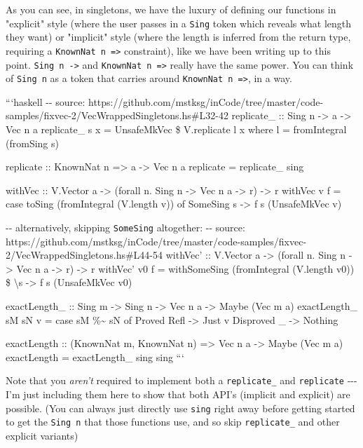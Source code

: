 \documentclass[]{article}
\begin{document}
As you can see, in singletons, we have the luxury of defining our functions in
"explicit" style (where the user passes in a \texttt{Sing} token which reveals
what length they want) or "implicit" style (where the length is inferred from
the return type, requiring a \texttt{KnownNat\ n\ =\textgreater{}} constraint),
like we have been writing up to this point. \texttt{Sing\ n\ -\textgreater{}}
and \texttt{KnownNat\ n\ =\textgreater{}} really have the same power. You can
think of \texttt{Sing\ n} as a token that carries around
\texttt{KnownNat\ n\ =\textgreater{}}, in a way.

```haskell -\/- source:
https://github.com/mstksg/inCode/tree/master/code-samples/fixvec-2/VecWrappedSingletons.hs\#L32-42
replicate\_ :: Sing n -\textgreater{} a -\textgreater{} Vec n a replicate\_ s x
= UnsafeMkVec \$ V.replicate l x where l = fromIntegral (fromSing s)

replicate :: KnownNat n =\textgreater{} a -\textgreater{} Vec n a replicate =
replicate\_ sing

withVec :: V.Vector a -\textgreater{} (forall n. Sing n -\textgreater{} Vec n a
-\textgreater{} r) -\textgreater{} r withVec v f = case toSing (fromIntegral
(V.length v)) of SomeSing s -\textgreater{} f s (UnsafeMkVec v)

-\/- alternatively, skipping \texttt{SomeSing} altogether: -\/- source:
https://github.com/mstksg/inCode/tree/master/code-samples/fixvec-2/VecWrappedSingletons.hs\#L44-54
withVec' :: V.Vector a -\textgreater{} (forall n. Sing n -\textgreater{} Vec n a
-\textgreater{} r) -\textgreater{} r withVec' v0 f = withSomeSing (fromIntegral
(V.length v0)) \$ \textbackslash{}s -\textgreater{} f s (UnsafeMkVec v0)

exactLength\_ :: Sing m -\textgreater{} Sing n -\textgreater{} Vec n a
-\textgreater{} Maybe (Vec m a) exactLength\_ sM sN v = case sM
\%\textasciitilde{} sN of Proved Refl -\textgreater{} Just v Disproved \_
-\textgreater{} Nothing

exactLength :: (KnownNat m, KnownNat n) =\textgreater{} Vec n a -\textgreater{}
Maybe (Vec m a) exactLength = exactLength\_ sing sing ```

Note that you \emph{aren't} required to implement both a \texttt{replicate\_}
and \texttt{replicate} -\/-\/- I'm just including them here to show that both
API's (implicit and explicit) are possible. (You can always just directly use
\texttt{sing} right away before getting started to get the \texttt{Sing\ n} that
those functions use, and so skip \texttt{replicate\_} and other explicit
variants)
\end{document}

